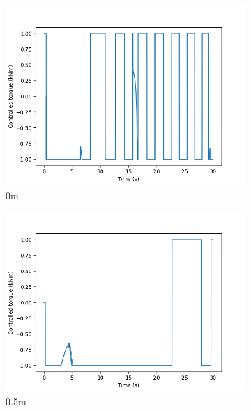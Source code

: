 \documentclass[class=article, crop=false]{standalone}
\begin{document}
\begin{figure}
    \centering
    \begin{subfigure}[b]{0.48\textwidth}
        \centering
        \includegraphics{scenario1/rov-50m/0.0m/usv_torque}
        \caption{0m}
        \label{}
    \end{subfigure}
    \hfill
    \begin{subfigure}[b]{0.48\textwidth}
        \centering
        \includegraphics{scenario1/rov-50m/0.5m/usv_torque}
        \caption{0.5m}
        \label{}
    \end{subfigure}
    \vfill
    \begin{subfigure}[b]{0.48\textwidth}
        \centering

\end{subfigure}
\end{figure}
\end{document}
